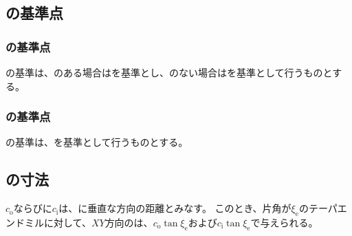 \subsection{\EndFaceCChamferMilling の基準点}

\subsubsection{\EndFaceOutCChamferMilling の基準点}
\EndFaceOutCChamferMilling の基準は、\Outcut のある場合は\OutcutCenter を基準とし、\Outcut のない場合は\EndFaceIDCenter を基準として行うものとする。

\subsubsection{\EndFaceInCChamferMilling の基準点}
\EndFaceInCChamferMilling の基準は、\OutcutIDCenter を基準として行うものとする。


\subsection{\EndFaceCChamfer の寸法}
\EndFaceOutCChamferLength$c_\mathrm o$ならびに\EndFaceInCChamferLength$c_\mathrm i$は、\EndFace に垂直な方向の距離とみなす。
このとき、片角が$\xi_\mathrm e$のテーパエンドミルに対して、$XY$方向の\EndFaceCChamferLength は、$c_\mathrm o\tan\xi_\mathrm e$および$c_\mathrm i\tan\xi_\mathrm e$で与えられる。


